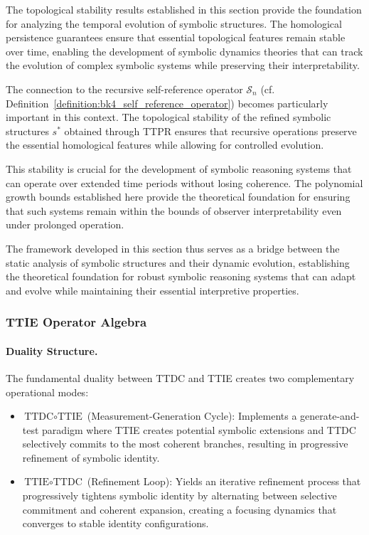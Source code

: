 \begin{remark}
\label{remark:bk4_topological_stability_to_symbolic_dynamics}
The topological stability results established in this section provide the foundation for analyzing the temporal evolution of symbolic structures. The homological persistence guarantees ensure that essential topological features remain stable over time, enabling the development of symbolic dynamics theories that can track the evolution of complex symbolic systems while preserving their interpretability.

The connection to the recursive self-reference operator $\mathcal{S}_n$ (cf. Definition~\ref{definition:bk4_self_reference_operator}) becomes particularly important in this context. The topological stability of the refined symbolic structures $s^*$ obtained through TTPR ensures that recursive operations preserve the essential homological features while allowing for controlled evolution.

This stability is crucial for the development of symbolic reasoning systems that can operate over extended time periods without losing coherence. The polynomial growth bounds established here provide the theoretical foundation for ensuring that such systems remain within the bounds of observer interpretability even under prolonged operation.

The framework developed in this section thus serves as a bridge between the static analysis of symbolic structures and their dynamic evolution, establishing the theoretical foundation for robust symbolic reasoning systems that can adapt and evolve while maintaining their essential interpretive properties.
\end{remark}

\subsubsection{TTIE Operator Algebra}
\label{subsec:bk4_ttie_operator_algebra}
\paragraph{Duality Structure.}
The fundamental duality between TTDC and TTIE creates two complementary operational modes:
\begin{itemize}
\item $\text{TTDC}\circ\text{TTIE}$ (Measurement-Generation Cycle): Implements a generate-and-test paradigm where TTIE creates potential symbolic extensions and TTDC selectively commits to the most coherent branches, resulting in progressive refinement of symbolic identity.
\item $\text{TTIE}\circ\text{TTDC}$ (Refinement Loop): Yields an iterative refinement process that progressively tightens symbolic identity by alternating between selective commitment and coherent expansion, creating a focusing dynamics that converges to stable identity configurations.
\end{itemize}

